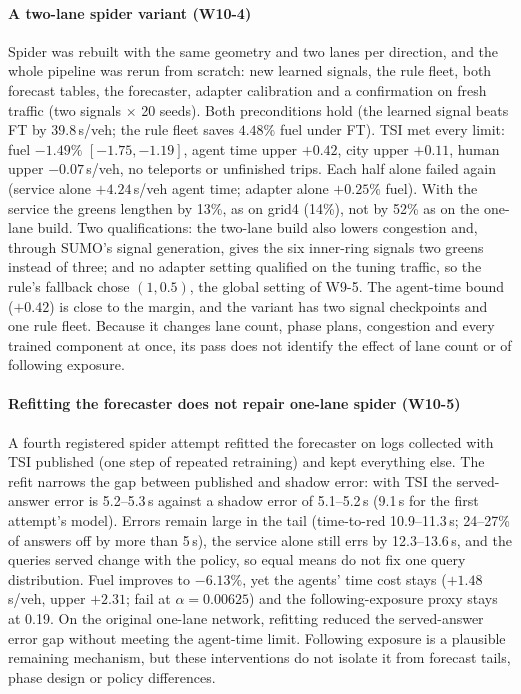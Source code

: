\paragraph{A two-lane spider variant (W10-4)} Spider was rebuilt with the same geometry and two lanes per direction,
and the whole pipeline was rerun from scratch: new learned signals, the rule fleet, both forecast tables, the forecaster, adapter
calibration and a confirmation on fresh traffic (two signals $\times$ 20 seeds). Both preconditions hold (the learned signal beats FT by
39.8\,s/veh; the rule fleet saves $4.48\%$ fuel under FT). TSI met every limit: fuel $-1.49\%$ $[-1.75,-1.19]$, agent time upper $+0.42$,
city upper $+0.11$, human upper $-0.07$\,s/veh, no teleports or unfinished trips. Each half alone failed again (service alone $+4.24$\,s/veh
agent time; adapter alone $+0.25\%$ fuel). With the service the greens lengthen by 13\%, as on grid4 (14\%), not by 52\% as on the one-lane
build. Two qualifications: the two-lane build also lowers congestion and, through SUMO's signal generation, gives the six inner-ring
signals two greens instead of three; and no adapter setting qualified on the tuning traffic, so the rule's fallback chose $(1,0.5)$, the
global setting of W9-5. The agent-time bound ($+0.42$) is close to the margin, and the variant has two signal checkpoints and one rule
fleet. Because it changes lane count, phase plans, congestion and every trained component at once, its pass does not identify the effect
of lane count or of following exposure.

\paragraph{Refitting the forecaster does not repair one-lane spider (W10-5)} A fourth registered spider attempt refitted the
forecaster on logs collected with TSI published (one step of repeated retraining) and kept everything else. The refit narrows the
gap between published and shadow error: with TSI the served-answer error is 5.2--5.3\,s against a shadow error of 5.1--5.2\,s (9.1\,s for
the first attempt's model). Errors remain large in the tail (time-to-red 10.9--11.3\,s; 24--27\% of answers off by more than 5\,s), the
service alone still errs by 12.3--13.6\,s, and the queries served change with the policy, so equal means do not fix one query distribution.
Fuel improves to $-6.13\%$, yet the agents' time cost stays ($+1.48$\,s/veh, upper $+2.31$; fail at $\alpha=0.00625$) and the following-exposure
proxy stays at 0.19. On the original one-lane network, refitting reduced the served-answer error gap without meeting the agent-time limit.
Following exposure is a plausible remaining mechanism, but these interventions do not isolate it from forecast tails, phase design or
policy differences.

